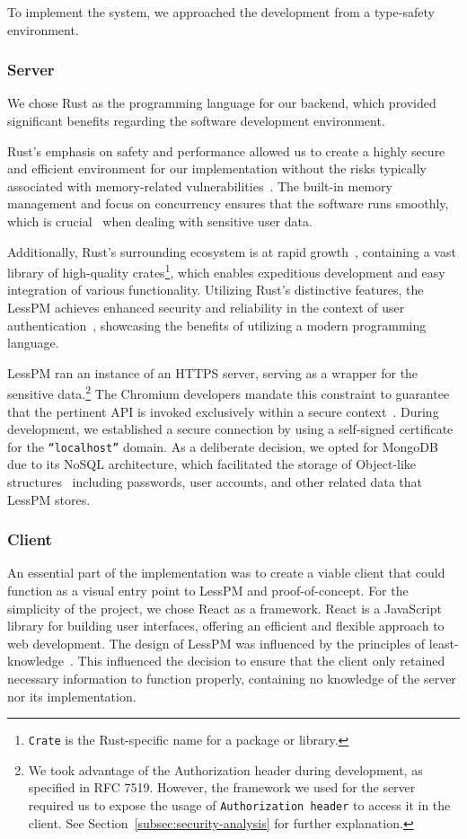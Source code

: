 To implement the system, we approached the development from a type-safety
environment.

\subsubsection{Server}
We chose Rust as the programming language for our backend, which provided
significant benefits regarding the software development environment.

Rust's emphasis on safety and performance allowed us to create a highly
secure and efficient environment for our implementation without the risks
typically associated with memory-related
vulnerabilities~\cite{rivera2019preserving}.
The built-in memory management and focus on concurrency ensures that the
software runs smoothly, which is crucial~\cite{fischer1985impossibility} when
dealing with sensitive user data.

Additionally, Rust's surrounding ecosystem is at rapid
growth~\cite{librs-stats}, containing a vast library of high-quality
crates\footnote{
  \texttt{Crate} is the Rust-specific name for a package or library.
}, which enables expeditious development and easy integration of various
functionality.
Utilizing Rust's distinctive features, the LessPM achieves enhanced security and
reliability in the context of user authentication~\cite{rivera2019preserving},
showcasing the benefits of utilizing a modern programming language.

LessPM ran an instance of an HTTPS server, serving as a wrapper for the
sensitive data.\footnote{
  We took advantage of the Authorization header during development, as specified
  in RFC 7519.
  However, the framework we used for the server required us to expose the usage
  of \texttt{Authorization header} to access it in the client.
  See Section~\ref{subsec:security-analysis} for further explanation.
}
The Chromium developers mandate this constraint to guarantee that the pertinent
API is invoked exclusively within a secure context~\cite{webdev2021credential}.
During development, we established a secure connection by using a self-signed
certificate for the \texttt{``localhost''} domain.
As a deliberate decision, we opted for MongoDB due to its NoSQL architecture,
which facilitated the storage of Object-like structures~\cite{mongodb2021nosql}
including passwords, user accounts, and other related data that LessPM stores.

\subsubsection{Client}
An essential part of the implementation was to create a viable client that could
function as a visual entry point to LessPM and proof-of-concept.
For the simplicity of the project, we chose React as a framework.
React is a JavaScript library for building user interfaces, offering an
efficient and flexible approach to web development.
The design of LessPM was influenced by the principles of
least-knowledge~\cite{lieberherr1990assuring}.
This influenced the decision to ensure that the client only retained
necessary information to function properly, containing no knowledge of
the server nor its implementation.

